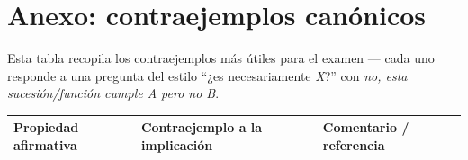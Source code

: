 \documentclass[11pt,twoside]{article}
\begin{document}
\newpage
\section{Anexo: contraejemplos canónicos}

Esta tabla recopila los contraejemplos más útiles para el examen --- cada uno responde a una pregunta del estilo ``¿es necesariamente \textit{X}?'' con \textit{no, esta sucesión/función cumple A pero no B}.

\renewcommand{\arraystretch}{1.35}
\begin{longtable}{p{} p{} p{}}
\hline
\textbf{Propiedad afirmativa} & \textbf{Contraejemplo a la implicación} & \textbf{Comentario / referencia} \\
\hline
\endhead


\end{longtable}
\end{document}
